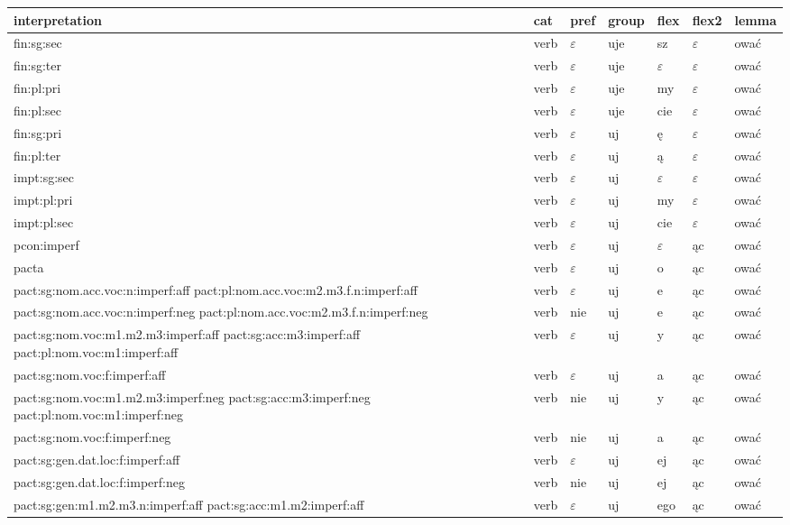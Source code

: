 \documentclass{article}
\begin{document}
\begin{longtable}{p{7cm}|l|l|l|l|l|l}
interpretation & cat & pref & group & flex & flex2 & lemma\\
\hline
fin:sg:sec & verb & $\varepsilon$ & uje & sz & $\varepsilon$ & ować\\
fin:sg:ter & verb & $\varepsilon$ & uje & $\varepsilon$ & $\varepsilon$ & ować\\
fin:pl:pri & verb & $\varepsilon$ & uje & my & $\varepsilon$ & ować\\
fin:pl:sec & verb & $\varepsilon$ & uje & cie & $\varepsilon$ & ować\\
fin:sg:pri & verb & $\varepsilon$ & uj & ę & $\varepsilon$ & ować\\
fin:pl:ter & verb & $\varepsilon$ & uj & ą & $\varepsilon$ & ować\\
impt:sg:sec & verb & $\varepsilon$ & uj & $\varepsilon$ & $\varepsilon$ & ować\\
impt:pl:pri & verb & $\varepsilon$ & uj & my & $\varepsilon$ & ować\\
impt:pl:sec & verb & $\varepsilon$ & uj & cie & $\varepsilon$ & ować\\
pcon:imperf & verb & $\varepsilon$ & uj & $\varepsilon$ & ąc & ować\\
pacta & verb & $\varepsilon$ & uj & o & ąc & ować\\
pact:sg:nom.acc.voc:n:imperf:aff pact:pl:nom.acc.voc:m2.m3.f.n:imperf:aff & verb & $\varepsilon$ & uj & e & ąc & ować\\
pact:sg:nom.acc.voc:n:imperf:neg pact:pl:nom.acc.voc:m2.m3.f.n:imperf:neg & verb & nie & uj & e & ąc & ować\\
pact:sg:nom.voc:m1.m2.m3:imperf:aff pact:sg:acc:m3:imperf:aff pact:pl:nom.voc:m1:imperf:aff & verb & $\varepsilon$ & uj & y & ąc & ować\\
pact:sg:nom.voc:f:imperf:aff & verb & $\varepsilon$ & uj & a & ąc & ować\\
pact:sg:nom.voc:m1.m2.m3:imperf:neg pact:sg:acc:m3:imperf:neg pact:pl:nom.voc:m1:imperf:neg & verb & nie & uj & y & ąc & ować\\
pact:sg:nom.voc:f:imperf:neg & verb & nie & uj & a & ąc & ować\\
pact:sg:gen.dat.loc:f:imperf:aff & verb & $\varepsilon$ & uj & ej & ąc & ować\\
pact:sg:gen.dat.loc:f:imperf:neg & verb & nie & uj & ej & ąc & ować\\
pact:sg:gen:m1.m2.m3.n:imperf:aff pact:sg:acc:m1.m2:imperf:aff & verb & $\varepsilon$ & uj & ego & ąc & ować\\

\end{longtable}
\end{document}
